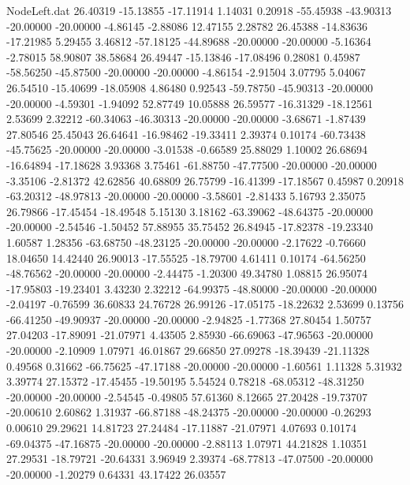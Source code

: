 \begin{filecontents}{NodeLeft.dat}
  26.40319  -15.13855  -17.11914     1.14031    0.20918  -55.45938  -43.90313  -20.00000  -20.00000   -4.86145   -2.88086   12.47155    2.28782
  26.45388  -14.83636  -17.21985     5.29455    3.46812  -57.18125  -44.89688  -20.00000  -20.00000   -5.16364   -2.78015   58.90807   38.58684
  26.49447  -15.13846  -17.08496     0.28081    0.45987  -58.56250  -45.87500  -20.00000  -20.00000   -4.86154   -2.91504    3.07795    5.04067
  26.54510  -15.40699  -18.05908     4.86480    0.92543  -59.78750  -45.90313  -20.00000  -20.00000   -4.59301   -1.94092   52.87749   10.05888
  26.59577  -16.31329  -18.12561     2.53699    2.32212  -60.34063  -46.30313  -20.00000  -20.00000   -3.68671   -1.87439   27.80546   25.45043
  26.64641  -16.98462  -19.33411     2.39374    0.10174  -60.73438  -45.75625  -20.00000  -20.00000   -3.01538   -0.66589   25.88029    1.10002
  26.68694  -16.64894  -17.18628     3.93368    3.75461  -61.88750  -47.77500  -20.00000  -20.00000   -3.35106   -2.81372   42.62856   40.68809
  26.75799  -16.41399  -17.18567     0.45987    0.20918  -63.20312  -48.97813  -20.00000  -20.00000   -3.58601   -2.81433    5.16793    2.35075
  26.79866  -17.45454  -18.49548     5.15130    3.18162  -63.39062  -48.64375  -20.00000  -20.00000   -2.54546   -1.50452   57.88955   35.75452
  26.84945  -17.82378  -19.23340     1.60587    1.28356  -63.68750  -48.23125  -20.00000  -20.00000   -2.17622   -0.76660   18.04650   14.42440
  26.90013  -17.55525  -18.79700     4.61411    0.10174  -64.56250  -48.76562  -20.00000  -20.00000   -2.44475   -1.20300   49.34780    1.08815
  26.95074  -17.95803  -19.23401     3.43230    2.32212  -64.99375  -48.80000  -20.00000  -20.00000   -2.04197   -0.76599   36.60833   24.76728
  26.99126  -17.05175  -18.22632     2.53699    0.13756  -66.41250  -49.90937  -20.00000  -20.00000   -2.94825   -1.77368   27.80454    1.50757
  27.04203  -17.89091  -21.07971     4.43505    2.85930  -66.69063  -47.96563  -20.00000  -20.00000   -2.10909    1.07971   46.01867   29.66850
  27.09278  -18.39439  -21.11328     0.49568    0.31662  -66.75625  -47.17188  -20.00000  -20.00000   -1.60561    1.11328    5.31932    3.39774
  27.15372  -17.45455  -19.50195     5.54524    0.78218  -68.05312  -48.31250  -20.00000  -20.00000   -2.54545   -0.49805   57.61360    8.12665
  27.20428  -19.73707  -20.00610     2.60862    1.31937  -66.87188  -48.24375  -20.00000  -20.00000   -0.26293    0.00610   29.29621   14.81723
  27.24484  -17.11887  -21.07971     4.07693    0.10174  -69.04375  -47.16875  -20.00000  -20.00000   -2.88113    1.07971   44.21828    1.10351
  27.29531  -18.79721  -20.64331     3.96949    2.39374  -68.77813  -47.07500  -20.00000  -20.00000   -1.20279    0.64331   43.17422   26.03557

\end{filecontents}
